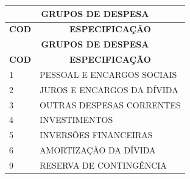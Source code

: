 \documentclass{article} %
\begin{document}

\renewcommand*{\arraystretch}{1.5}

\scriptsize

\noindent\begin{longtable}[c]{m{1cm}|m{11cm}}

\multicolumn{2}{c}{\cellcolor{gray!50} \textcolor{vermelhoTitulo} {\normalsize \textbf{GRUPOS DE DESPESA}}}\Tstrut  \\[2ex]
\hline\hline
 \multicolumn{1}{c|}{\textbf{COD}} & \multicolumn{1}{c}{\textbf{ESPECIFICAÇÃO}} \\

\hline
 \endfirsthead
 \multicolumn{2}{c}{\cellcolor{gray!50} \textcolor{vermelhoTitulo} {\normalsize \textbf{GRUPOS DE DESPESA}}}\Tstrut  \\[2ex]
\hline\hline
 \multicolumn{1}{c|}{\textbf{COD}} & \multicolumn{1}{c}{\textbf{ESPECIFICAÇÃO}} \\
 \hline
  \endhead
 \endfoot

1 & PESSOAL E ENCARGOS SOCIAIS  \\
2 & JUROS E ENCARGOS DA DÍVIDA  \\
3 & OUTRAS DESPESAS CORRENTES  \\
4 & INVESTIMENTOS  \\
5 & INVERSÕES FINANCEIRAS  \\
6 & AMORTIZAÇÃO DA DÍVIDA  \\
9 & RESERVA DE CONTINGÊNCIA  \\


\end{longtable}
\end{document}

